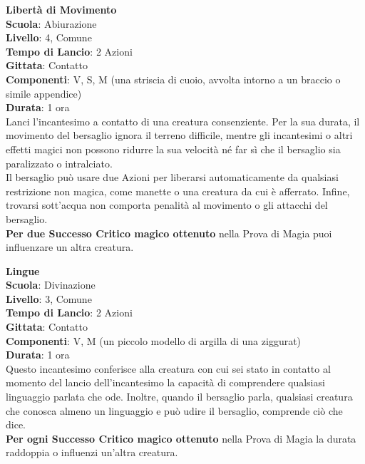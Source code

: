 \begin{multicols}{2}
\medskip\textbf{Libertà di Movimento}\\
\textbf{Scuola}: Abiurazione\\
\textbf{Livello}: 4, Comune\\
\textbf{Tempo di Lancio}: 2 Azioni\\
\textbf{Gittata}: Contatto\\
\textbf{Componenti}: V, S, M (una striscia di cuoio, avvolta intorno a un braccio o simile appendice)\\
\textbf{Durata}: 1 ora\\
Lanci l'incantesimo a contatto di una creatura consenziente. Per la sua durata, il movimento del bersaglio ignora il terreno difficile, mentre gli incantesimi o altri effetti magici non possono ridurre la sua velocità né far sì che il bersaglio sia paralizzato o intralciato.\\
Il bersaglio può usare due Azioni per liberarsi automaticamente da qualsiasi restrizione non magica, come manette o una creatura da cui è afferrato. Infine, trovarsi sott'acqua non comporta penalità al movimento o gli attacchi del bersaglio.\\
\textbf{Per due Successo Critico magico ottenuto} nella Prova di Magia puoi influenzare un altra creatura.

\medskip\textbf{Lingue}\\
\textbf{Scuola}: Divinazione\\
\textbf{Livello}: 3, Comune\\
\textbf{Tempo di Lancio}: 2 Azioni\\
\textbf{Gittata}: Contatto\\
\textbf{Componenti}: V, M (un piccolo modello di argilla di una ziggurat)\\
\textbf{Durata}: 1 ora\\
Questo incantesimo conferisce alla creatura con cui sei stato in contatto al momento del lancio dell'incantesimo la capacità di comprendere qualsiasi linguaggio parlata che ode. Inoltre, quando il bersaglio parla, qualsiasi creatura che conosca almeno un linguaggio e può udire il bersaglio, comprende ciò che dice.\\
\textbf{Per ogni Successo Critico magico ottenuto} nella Prova di Magia la durata raddoppia o influenzi un'altra creatura.


\end{multicols}
